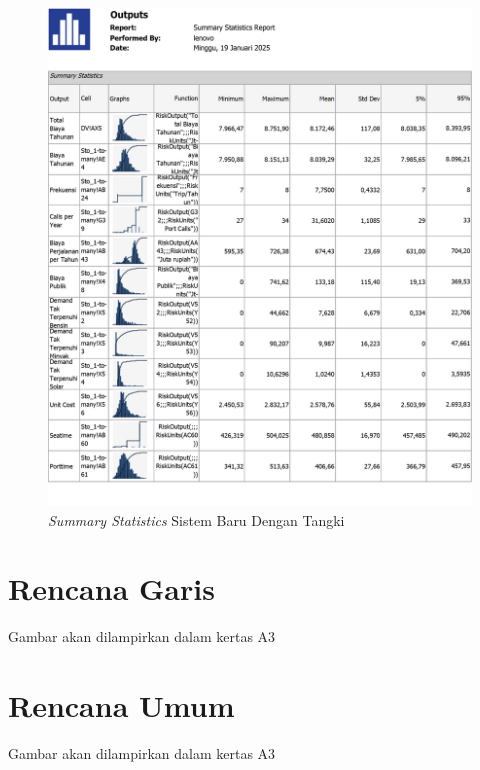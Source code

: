 \begin{figure}[!ht]
    \centering
    \includegraphics[width=\linewidth,height=\textheight,keepaspectratio]{lampiran/summary-tangki.jpg}
    \caption*{\emph{Summary Statistics} Sistem Baru Dengan Tangki}
\end{figure}

\section*{Rencana Garis}
\label{sec:rencana-garis}

Gambar akan dilampirkan dalam kertas A3
\clearpage



\section*{Rencana Umum}
\label{sec:rencana-umum}

Gambar akan dilampirkan dalam kertas A3
\clearpage
